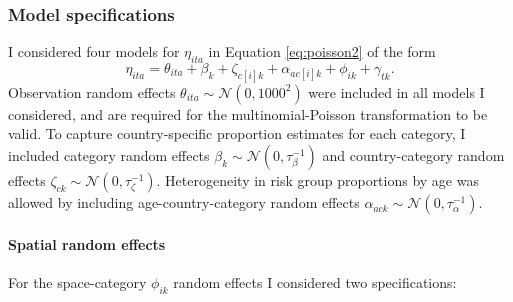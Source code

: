 \documentclass[a4paper, nobind]{templates/ociamthesis}
\begin{document}
\hypertarget{model-specifications}{%
\subsubsection{Model specifications}\label{model-specifications}}

I considered four models for \(\eta_{ita}\) in Equation \eqref{eq:poisson2} of the form
\begin{equation}
\eta_{ita} = \theta_{ita} + \beta_k + \zeta_{c[i]k} + \alpha_{ac[i]k} + \phi_{ik} + \gamma_{tk}.
\end{equation}
Observation random effects \(\theta_{ita} \sim \mathcal{N}(0, 1000^2)\) were included in all models I considered, and are required for the multinomial-Poisson transformation to be valid.
To capture country-specific proportion estimates for each category, I included category random effects \(\beta_k \sim \mathcal{N}(0, \tau_\beta^{-1})\) and country-category random effects \(\zeta_{ck} \sim \mathcal{N}(0, \tau_\zeta^{-1})\).
Heterogeneity in risk group proportions by age was allowed by including age-country-category random effects \(\alpha_{ack} \sim \mathcal{N}(0, \tau_\alpha^{-1})\).

\hypertarget{spatial-random-effects}{%
\paragraph{Spatial random effects}\label{spatial-random-effects}}

For the space-category \(\phi_{ik}\) random effects I considered two specifications:
\end{document}
